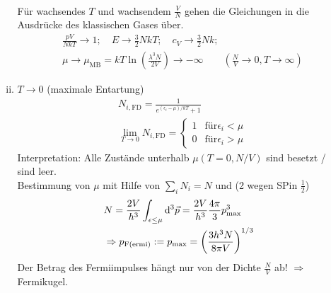 \begin{enumerate}[A)]
\begin{enumerate}[i)]
\begin{equation}
\begin{split}
            \end{split}
        \end{equation}
        Für wachsendes $T$ und wachsendem $\frac{V}{N}$ gehen die Gleichungen in die Ausdrücke des klassischen Gases über.
        \begin{equation}
            \begin{split}
                & \frac{p V}{N k T} \to 1; \quad E \to \frac{3}{2} N k T; \quad c_V \to \frac{3}{2} N k; \\
                & \mu \to \mu_\text{MB} = k T \ln \left( \frac{\lambda^3 N}{2 V} \right) \to - \infty \qquad \left( \frac{N}{V} \to 0, T \to \infty \right)
            \end{split}
        \end{equation}
        \item $T \to 0$ (maximale Entartung)
        \begin{equation}
            \begin{split}
                & N_{i, \text{FD}} = \frac{1}{e^{(\epsilon_i - \mu) / k T} + 1} \\
                & \lim_{T\to 0} N_{i, \text{FD}} =
                \begin{cases}
                    1 & \text{für} \epsilon_i < \mu \\
                    0 & \text{für} \epsilon_i > \mu
                \end{cases}
            \end{split}
        \end{equation}
        Interpretation: Alle Zustände unterhalb $\mu (T=0, N/V)$ sind besetzt / sind leer. \\
        Bestimmung von $\mu$ mit Hilfe von $\sum_i N_i = N$ und (2 wegen SPin $\frac{1}{2}$)
        \begin{equation}
            \begin{split}
                & N = \frac{2 V}{h^3} \int_{\epsilon \leq \mu} \mathrm{d}^3 \vec{p} = \frac{2 V}{h^3} \frac{4 \pi}{3} p_\text{max}^3 \\
                & \Rightarrow p_\text{F(ermi)} := p_\text{max} = \left( \frac{3 h^3 N}{8 \pi V} \right)^{1/3}
            \end{split}
        \end{equation}
        Der Betrag des Fermiimpulses hängt nur von der Dichte $\frac{N}{V}$ ab! $\Rightarrow$ Fermikugel.
        \begin{figure}[H]
        \centering
        \def\svgwidth{0.5\textwidth}

\end{figure}
\end{enumerate}
\end{enumerate}
